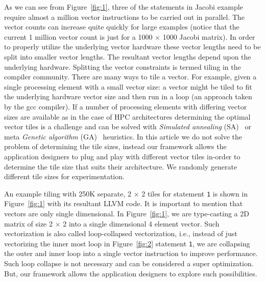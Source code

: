 As we can see from Figure~\ref{fig:1}, three of the statements in Jacobi
example require almost a million vector instructions to be carried out
in parallel. The vector counts can increase quite quickly for large
examples (notice that the current 1 million vector count is just for a
1000 $\times$ 1000 Jacobi matrix). In order to properly utilize the
underlying vector hardware these vector lengths need to be split into
smaller vector lengths. The resultant vector lengths depend upon the
underlying hardware. Splitting the vector constraints is termed tiling
in the compiler community. There are many ways to tile a vector. For
example, given a single processing element with a small vector size: a
vector might be tiled to fit the underlying hardware vector size and
then run in a loop (an approach taken by the gcc compiler). If a number
of processing elements with differing vector sizes are available as in
the case of HPC architectures determining the optimal vector tiles is a
challenge and can be solved with \textit{Simulated annealing}
(SA)~\cite{tbra01} or meta \textit{Genetic algorithm} (GA)~\cite{tbra01}
heuristics. In this article we do not solve the problem of determining
the tile sizes, instead our framework allows the application designers
to plug and play with different vector tiles in-order to determine the
tile size that suits their architecture. We randomly generate different
tile sizes for experimentation.

An example tiling with 250K separate, 2 $\times$ 2 tiles for statement
\texttt{1} is shown in Figure~\ref{fig:1} with its resultant LLVM
code. It is important to mention that vectors are only single
dimensional. In Figure~\ref{fig:1}, we are type-casting a 2D matrix of
size 2 $\times$ 2 into a single dimensional 4 element vector. Such
vectorization is also called loop-collapsed vectorization, i.e., instead
of just vectorizing the inner most loop in Figure~\ref{fig:2} statement
\texttt{1}, we are collapsing the outer and inner loop into a single
vector instruction to improve performance. Such loop collapse is not
necessary and can be considered a super optimization. But, our framework
allows the application designers to explore such possibilities.



